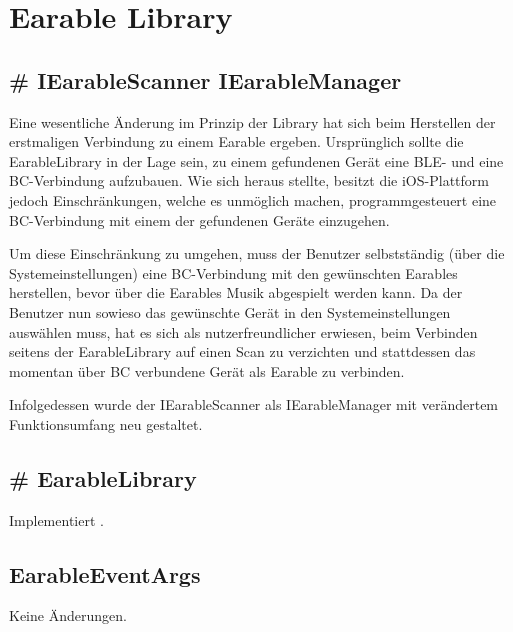 \documentclass[../implementierung.tex]{subfiles}
\begin{document}
	\section{Earable Library}
		\subsection{\# IEarableScanner \changeto{} IEarableManager}
			Eine wesentliche Änderung im Prinzip der Library hat sich beim Herstellen der erstmaligen Verbindung zu einem Earable ergeben.
			Ursprünglich sollte die EarableLibrary in der Lage sein, zu einem gefundenen Gerät eine BLE- und eine BC-Verbindung aufzubauen.
			Wie sich heraus stellte, besitzt die iOS-Plattform jedoch Einschränkungen, welche es unmöglich machen, programmgesteuert eine BC-Verbindung
			mit einem der gefundenen Geräte einzugehen.

			Um diese Einschränkung zu umgehen, muss der Benutzer selbstständig (über die Systemeinstellungen) eine BC-Verbindung mit
			den gewünschten Earables herstellen, bevor über die Earables Musik abgespielt werden kann.
			Da der Benutzer nun sowieso das gewünschte Gerät in den Systemeinstellungen auswählen muss, hat es sich als nutzerfreundlicher erwiesen,
			beim Verbinden seitens der EarableLibrary auf einen Scan zu verzichten und stattdessen das momentan über BC verbundene Gerät als Earable zu verbinden.

			Infolgedessen wurde der IEarableScanner als IEarableManager mit verändertem Funktionsumfang neu gestaltet.

			\begin{itemize}
			\end{itemize}

		\subsection{\# EarableLibrary}
			Implementiert .

		\subsection{EarableEventArgs}
			Keine Änderungen.
\end{document}
